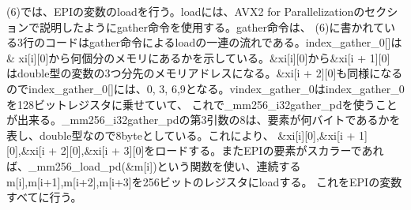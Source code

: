 \documentclass{jarticle}
\begin{document}
(6)では、EPIの変数のloadを行う。loadには、AVX2 for Parallelizationのセクションで説明したようにgather命令を使用する。gather命令は、
(6)に書かれている3行のコードはgather命令によるloadの一連の流れである。index\_gather\_0[]は\& xi[i][0]から何個分のメモリにあるかを示している。\&xi[i][0]から\&xi[i + 1][0]
はdouble型の変数の3つ分先のメモリアドレスになる。\&xi[i + 2][0]も同様になるのでindex\_gather\_0[]には、{0, 3, 6,9}となる。vindex\_gather\_0はindex\_gather\_0を128ビットレジスタに乗せていて、
これで\_mm256\_i32gather\_pdを使うことが出来る。\_mm256\_i32gather\_pdの第3引数の8は、要素が何バイトであるかを表し、double型なので8byteとしている。これにより、
\&xi[i][0],\&xi[i + 1][0],\&xi[i + 2][0],\&xi[i + 3][0]をロードする。またEPIの要素がスカラーであれば、\_mm256\_load\_pd(\&m[i])という関数を使い、連続するm[i],m[i+1],m[i+2],m[i+3]を256ビットのレジスタにloadする。
これをEPIの変数すべてに行う。
\end{document}
